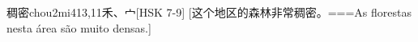 \begin{EntryWithPhonetic}{稠密}{chou2mi4}{13,11}{⽲、⼧}[HSK 7-9]
  [这个地区的森林非常稠密。===As florestas nesta área são muito densas.]
\end{EntryWithPhonetic}
